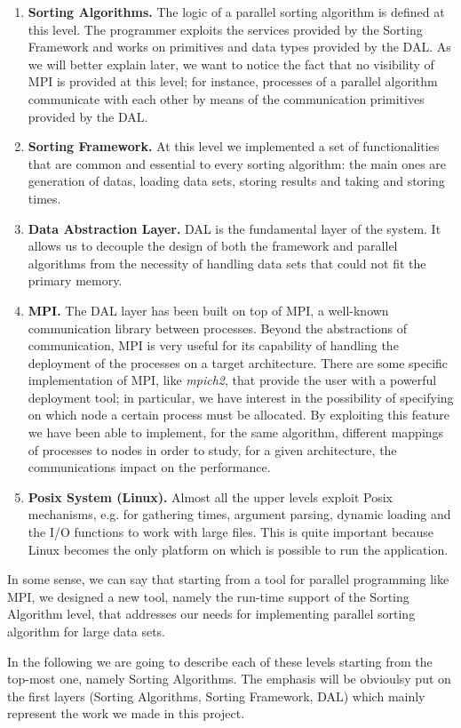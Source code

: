 \begin{enumerate}
\item \textbf{Sorting Algorithms.} The logic of a parallel sorting algorithm is defined at this level. The programmer exploits the services provided by the Sorting Framework and works on primitives and data types provided by the DAL. As we will better explain later, we want to notice the fact that no visibility of MPI is provided at this level; for instance, processes of a parallel algorithm communicate with each other by means of the communication primitives provided by the DAL.  
\item \textbf{Sorting Framework.} At this level we implemented a set of functionalities that are common and essential to every sorting algorithm: the main ones are generation of datas, loading data sets, storing results and taking and storing times.
\item \textbf{Data Abstraction Layer.} DAL is the fundamental layer of the system. It allows us to decouple the design of both the framework and parallel algorithms from the necessity of handling data sets that could not fit the primary memory. 
\item \textbf{MPI.} The DAL layer has been built on top of MPI, a well-known communication library between processes. Beyond the abstractions of communication, MPI is very useful for its capability of handling the deployment of the processes on a target architecture. There are some specific implementation of MPI, like \textit{mpich2}, that provide the user with a powerful deployment tool; in particular, we have interest in the possibility of specifying on which node a certain process must be allocated. By exploiting this feature we have been able to implement, for the same algorithm, different mappings of processes to nodes in order to study, for a given architecture, the communications impact on the performance. 
\item \textbf{Posix System (Linux).} Almost all the upper levels exploit Posix mechanisms, e.g. for gathering times, argument parsing, dynamic loading and the I/O functions to work with large files. This is quite important because Linux becomes the only platform on which is possible to run the application. 
\end{enumerate}
In some sense, we can say that starting from a tool for parallel programming like MPI, we designed a new tool, namely the run-time support of the Sorting Algorithm level, that addresses our needs for implementing parallel sorting algorithm for large data sets. 

In the following we are going to describe each of these levels starting from the top-most one, namely Sorting Algorithms. The emphasis will be obvioulsy put on the first layers (Sorting Algorithms, Sorting Framework, DAL) which mainly represent the work we made in this project.

